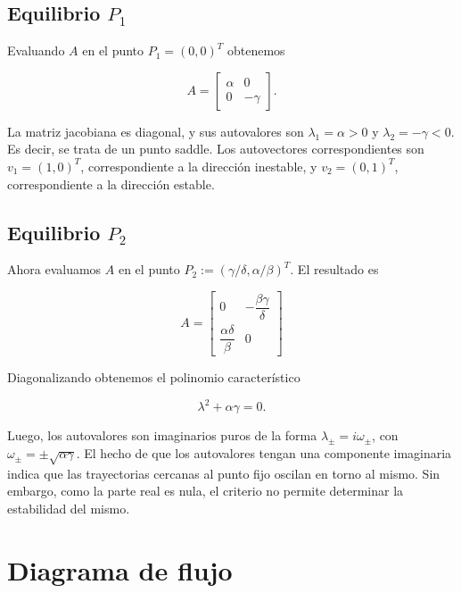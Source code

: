 \documentclass[10pt,twocolumn]{article}
\begin{document}
\subsection{Equilibrio $P_1$}

Evaluando $A$ en el punto $P_1 = (0,0)^T$ obtenemos

\begin{equation}
A =
\begin{bmatrix}
\alpha & 0 \\
0 & -\gamma
\end{bmatrix}.
\end{equation}

La matriz jacobiana es diagonal, y sus autovalores son $\lambda_1 = \alpha > 0$ y $\lambda_2 = -\gamma < 0$. Es decir, se trata de un punto saddle. Los autovectores correspondientes son $v_1 = (1, 0)^T$, correspondiente a la dirección inestable, y $v_2 = (0, 1)^T$, correspondiente a la dirección estable. 

\subsection{Equilibrio $P_2$}

Ahora evaluamos $A$ en el punto $P_2:= (\gamma/\delta, \alpha/\beta)^T$. El resultado es 

\begin{equation}
A =
\begin{bmatrix}
0 & -\dfrac{\beta \gamma}{\delta} \\
\dfrac{\alpha \delta}{\beta} & 0
\end{bmatrix}
\end{equation}

Diagonalizando obtenemos el polinomio característico

\begin{equation}
\lambda^2 + \alpha \gamma = 0.
\end{equation}

Luego, los autovalores son imaginarios puros de la forma $\lambda_{\pm} = i \omega_{\pm}$, con $\omega_{\pm} = \pm \sqrt{\alpha \gamma}$. El hecho de que los autovalores tengan una componente imaginaria indica que las trayectorias cercanas al punto fijo oscilan en torno al mismo. Sin embargo, como la parte real es nula, el criterio no permite determinar la estabilidad del mismo.


\section{Diagrama de flujo}
\end{document}
